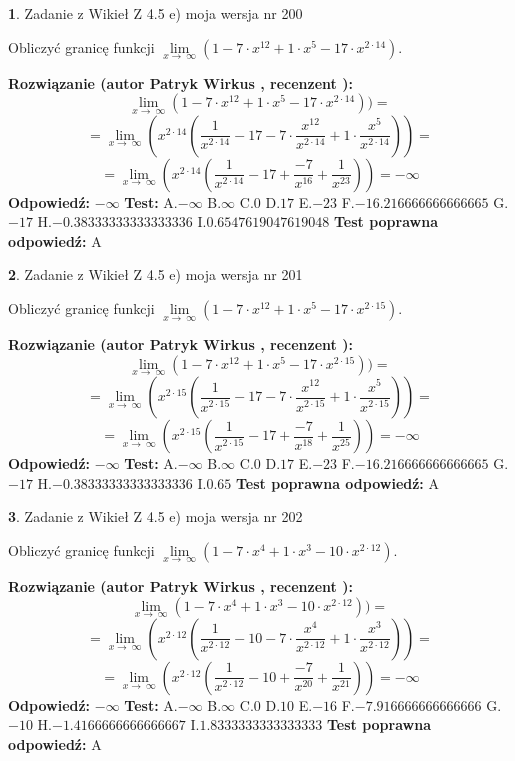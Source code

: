 \documentclass[12pt, a4paper]{article}
\theoremstyle{definition} %
\newtheorem{zad}{}
\newcommand{\zadStart}[1]{\begin{zad}#1\newline}
\newcommand{\zadStop}{\end{zad}}
\newcommand{\rozwStart}[2]{\noindent \textbf{Rozwiązanie (autor #1 , recenzent #2): }\newline}
\newcommand{\rozwStop}{\newline}
\newcommand{\odpStart}{\noindent \textbf{Odpowiedź:}\newline}
\newcommand{\odpStop}{\newline}
\newcommand{\testStart}{\noindent \textbf{Test:}\newline}
\newcommand{\testStop}{\newline}
\newcommand{\kluczStart}{\noindent \textbf{Test poprawna odpowiedź:}\newline}
\newcommand{\kluczStop}{\newline}
\begin{document}
\zadStart{Zadanie z Wikieł Z 4.5 e) moja wersja nr 200}


Obliczyć granicę funkcji  $\lim\limits_{x\to\ \infty}(1 - 7 \cdot x^{12}+1 \cdot x^{5}- 17 \cdot x^{2\cdot14})$.
\zadStop
\rozwStart{Patryk Wirkus}{}
$$\lim\limits_{x\to\ \infty}(1 - 7 \cdot x^{12}+1 \cdot x^{5}- 17 \cdot x^{2\cdot14}))=$$
$$=\lim\limits_{x\to\ \infty}(x^{2\cdot14}(\frac{1}{x^{2\cdot14}}-17 -7 \cdot \frac{x^{12}}{x^{2\cdot14}}+1 \cdot \frac{x^{5}}{x^{2\cdot14}}))=$$
$$=\lim\limits_{x\to\ \infty}(x^{2\cdot14}(\frac{1}{x^{2\cdot14}}-17 + \frac{-7}{x^{16}}+ \frac{1}{x^{23}}))=-\infty$$
\rozwStop
\odpStart
$-\infty$
\odpStop
\testStart
A.$-\infty$ B.$\infty$ C.$0$ D.$17$ E.$-23$
F.$-16.216666666666665$ G.$-17$
H.$-0.38333333333333336$
I.$0.6547619047619048$
\testStop
\kluczStart
A
\kluczStop



\zadStart{Zadanie z Wikieł Z 4.5 e) moja wersja nr 201}


Obliczyć granicę funkcji  $\lim\limits_{x\to\ \infty}(1 - 7 \cdot x^{12}+1 \cdot x^{5}- 17 \cdot x^{2\cdot15})$.
\zadStop
\rozwStart{Patryk Wirkus}{}
$$\lim\limits_{x\to\ \infty}(1 - 7 \cdot x^{12}+1 \cdot x^{5}- 17 \cdot x^{2\cdot15}))=$$
$$=\lim\limits_{x\to\ \infty}(x^{2\cdot15}(\frac{1}{x^{2\cdot15}}-17 -7 \cdot \frac{x^{12}}{x^{2\cdot15}}+1 \cdot \frac{x^{5}}{x^{2\cdot15}}))=$$
$$=\lim\limits_{x\to\ \infty}(x^{2\cdot15}(\frac{1}{x^{2\cdot15}}-17 + \frac{-7}{x^{18}}+ \frac{1}{x^{25}}))=-\infty$$
\rozwStop
\odpStart
$-\infty$
\odpStop
\testStart
A.$-\infty$ B.$\infty$ C.$0$ D.$17$ E.$-23$
F.$-16.216666666666665$ G.$-17$
H.$-0.38333333333333336$
I.$0.65$
\testStop
\kluczStart
A
\kluczStop



\zadStart{Zadanie z Wikieł Z 4.5 e) moja wersja nr 202}


Obliczyć granicę funkcji  $\lim\limits_{x\to\ \infty}(1 - 7 \cdot x^{4}+1 \cdot x^{3}- 10 \cdot x^{2\cdot12})$.
\zadStop
\rozwStart{Patryk Wirkus}{}
$$\lim\limits_{x\to\ \infty}(1 - 7 \cdot x^{4}+1 \cdot x^{3}- 10 \cdot x^{2\cdot12}))=$$
$$=\lim\limits_{x\to\ \infty}(x^{2\cdot12}(\frac{1}{x^{2\cdot12}}-10 -7 \cdot \frac{x^{4}}{x^{2\cdot12}}+1 \cdot \frac{x^{3}}{x^{2\cdot12}}))=$$
$$=\lim\limits_{x\to\ \infty}(x^{2\cdot12}(\frac{1}{x^{2\cdot12}}-10 + \frac{-7}{x^{20}}+ \frac{1}{x^{21}}))=-\infty$$
\rozwStop
\odpStart
$-\infty$
\odpStop
\testStart
A.$-\infty$ B.$\infty$ C.$0$ D.$10$ E.$-16$
F.$-7.916666666666666$ G.$-10$
H.$-1.4166666666666667$
I.$1.8333333333333333$
\testStop
\kluczStart
A
\kluczStop
\end{document}
